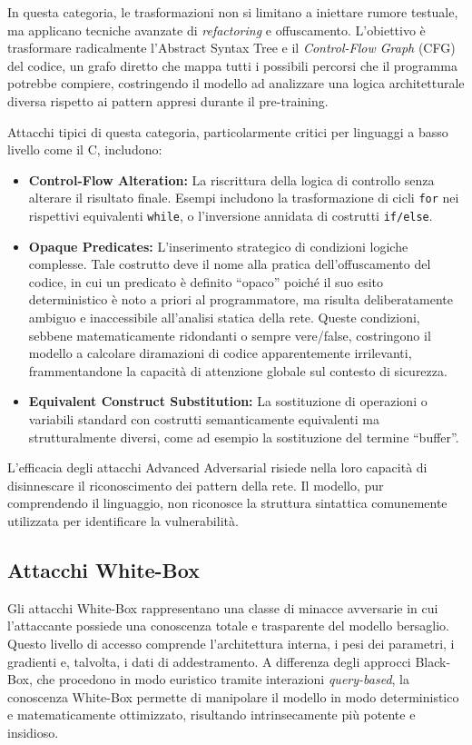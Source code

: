 In questa categoria, le trasformazioni non si limitano a iniettare rumore testuale, ma applicano tecniche avanzate di \textit{refactoring} e offuscamento. L'obiettivo è trasformare radicalmente l'Abstract Syntax Tree e il \textit{Control-Flow Graph} (CFG) del codice, un grafo diretto che mappa tutti i possibili percorsi che il programma potrebbe compiere, costringendo il modello ad analizzare una logica architetturale diversa rispetto ai pattern appresi durante il pre-training.

Attacchi tipici di questa categoria, particolarmente critici per linguaggi a basso livello come il C, includono:
\begin{itemize}
    \item \textbf{Control-Flow Alteration:} La riscrittura della logica di controllo senza alterare il risultato finale. Esempi includono la trasformazione di cicli \texttt{for} nei rispettivi equivalenti \texttt{while}, o l'inversione annidata di costrutti \texttt{if/else}.
    \item \textbf{Opaque Predicates:} L'inserimento strategico di condizioni logiche complesse. Tale costrutto deve il nome alla pratica dell'offuscamento del codice, in cui un predicato è definito \enquote{opaco} poiché il suo esito deterministico è noto a priori al programmatore, ma risulta deliberatamente ambiguo e inaccessibile all'analisi statica della rete. Queste condizioni, sebbene matematicamente ridondanti o sempre vere/false, costringono il modello a calcolare diramazioni di codice apparentemente irrilevanti, frammentandone la capacità di attenzione globale sul contesto di sicurezza.
    \item \textbf{Equivalent Construct Substitution:} La sostituzione di operazioni o variabili standard con costrutti semanticamente equivalenti ma strutturalmente diversi, come ad esempio la sostituzione del termine \enquote{buffer}.
\end{itemize}

L'efficacia degli attacchi Advanced Adversarial risiede nella loro capacità di disinnescare il riconoscimento dei pattern della rete. Il modello, pur comprendendo il linguaggio, non riconosce la struttura sintattica comunemente utilizzata per identificare la vulnerabilità. 

\subsection{Attacchi White-Box}
Gli attacchi White-Box rappresentano una classe di minacce avversarie in cui l'attaccante possiede una conoscenza totale e trasparente del modello bersaglio. Questo livello di accesso comprende l'architettura interna, i pesi dei parametri, i gradienti e, talvolta, i dati di addestramento. A differenza degli approcci Black-Box, che procedono in modo euristico tramite interazioni \textit{query-based}, la conoscenza White-Box permette di manipolare il modello in modo deterministico e matematicamente ottimizzato, risultando intrinsecamente più potente e insidioso.


